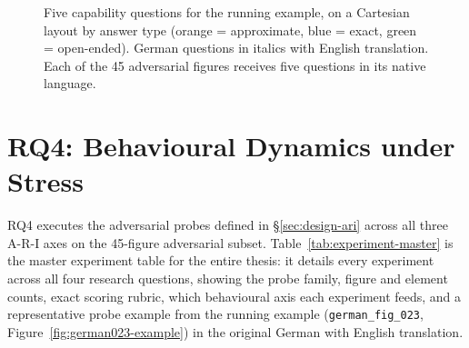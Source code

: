 \begin{figure}[H]
{}%
  \caption[Capability questions for \texttt{german\_fig\_023}.]{%
    Five capability questions for the running example, on a Cartesian layout by answer type (orange = approximate, blue = exact, green = open-ended). German questions in italics with English translation. Each of the 45 adversarial figures receives five questions in its native language.}
  \label{fig:capability-questions}
\end{figure}

\section{RQ4: Behavioural Dynamics under Stress}
\label{sec:impl-rq4}\label{sec:impl-rq4-hallucination}\label{sec:impl-rq4-caption}\label{sec:impl-rq4-reverse}\label{sec:impl-rq4-admittance}\label{sec:impl-rq4-passive}\label{sec:impl-rq4-inductance}\label{sec:impl-rq4-cot}\label{sec:impl-summary}\label{fig:probe-examples}

RQ4 executes the adversarial probes defined in \S\ref{sec:design-ari} across all three A-R-I axes on the 45-figure adversarial subset.
Table~\ref{tab:experiment-master} is the master experiment table for the entire thesis: it details every experiment across all four research questions, showing the probe family, figure and element counts, exact scoring rubric, which behavioural axis each experiment feeds, and a representative probe example from the running example (\texttt{german\_fig\_023}, Figure~\ref{fig:german023-example}) in the original German with English translation.

